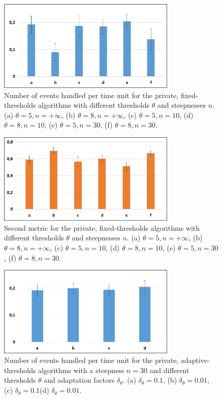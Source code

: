 \begin{figure}[thpb]
      \centering
      \includegraphics[width=8.5cm]{Pictures/PrivFixedMetric1.png}
      \caption{Number of events handled per time unit for the private, fixed-thresholds algorithms with different thresholds $\theta$ and steepnesses $n$. (a) $\theta=5, n=+\infty$, (b) $\theta=8, n=+\infty$, (c) $\theta=5, n=10$, (d) $\theta=8, n=10$, (e) $\theta=5, n=30$, (f) $\theta=8, n=30$.}
      \label{figure1}
   \end{figure}
	 \begin{figure}[thpb]
      \centering
      \includegraphics[width=8.5cm]{Pictures/PrivFixedMetric2.png}
      \caption{Second metric for the private, fixed-thresholds algorithms with different thresholds $\theta$ and steepnesses $n$. (a) $\theta=5, n=+\infty$, (b) $\theta=8, n=+\infty$, (c) $\theta=5, n=10$, (d) $\theta=8, n=10$, (e) $\theta=5, n=30$, (f) $\theta=8, n=30$.}
      \label{figure2}
   \end{figure}
	\begin{figure}[thpb]
      \centering
      \includegraphics[width=8.5cm]{Pictures/PrivAdaptMetric1.png}
      \caption{Number of events handled per time unit for the private, adaptive-thresholds algorithms with a steepness $n=30$ and different thresholds $\theta$ and adaptation factors $\delta_{\theta}$. (a) $\delta_{\theta}=0.1$, (b) $\delta_{\theta}=0.01$, (c) $\delta_{\theta}=0.1$(d) $\delta_{\theta}=0.01$.}
      \label{figure3}
   \end{figure}
